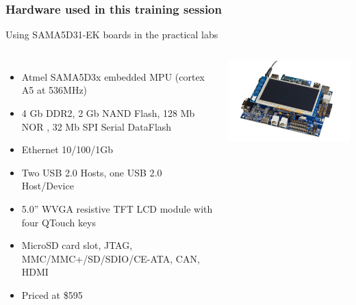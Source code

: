 \begin{frame}
\frametitle{Hardware used in this training session}
  Using SAMA5D31-EK boards in the practical labs
  \begin{columns}
    \begin{itemize}
      \item Atmel SAMA5D3x embedded MPU (cortex A5 at 536MHz)
      \item 4 Gb DDR2, 2 Gb NAND Flash, 128 Mb NOR , 32 Mb SPI Serial DataFlash
      \item Ethernet 10/100/1Gb
      \item Two USB 2.0 Hosts, one USB 2.0 Host/Device
      \item 5.0” WVGA resistive TFT LCD module with four QTouch keys
      \item MicroSD card slot, JTAG, MMC/MMC+/SD/SDIO/CE-ATA, CAN, HDMI
      \item Priced at \$595
    \end{itemize}
    \includegraphics[width=\textwidth]{slides/sama5d3-board/sama5d31ek.jpg}
  \end{columns}
\end{frame}
